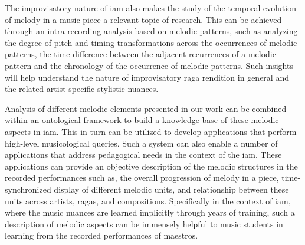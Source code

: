 The improvisatory nature of \gls{iam} also makes the study of the temporal evolution of melody in a music piece a relevant topic of research. This can be achieved through an intra-recording analysis based on melodic patterns, such as analyzing the degree of pitch and timing transformations across the occurrences of melodic patterns, the time difference between the adjacent recurrences of a melodic pattern and the chronology of the occurrence of melodic patterns. Such insights will help understand the nature of improvisatory \gls{raga} rendition in general and the related artist specific stylistic nuances.

 Analysis of different melodic elements presented in our work can be combined within an ontological framework to build a knowledge base of these melodic aspects in \gls{iam}. This in turn can be utilized to develop applications that perform high-level musicological queries. Such a system can also enable a number of applications that address pedagogical needs in the context of the \gls{iam}. These applications can provide an objective description of the melodic structures in  the recorded performances such as, the overall progression of melody in a piece, time-synchronized display of different melodic units, and relationship between these units across artists, \glspl{raga}, and compositions. Specifically in the context of \gls{iam}, where the music nuances are learned implicitly through years of training, such a description of melodic aspects can be immensely helpful to music students in learning from the recorded performances of maestros.


